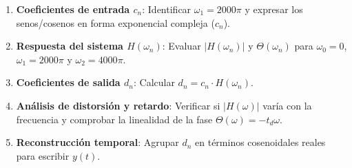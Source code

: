 \begin{mecanizado}
\begin{enumerate}
    \item \textbf{Coeficientes de entrada $c_n$}: Identificar $\omega_1 = 2000\pi$ y expresar los senos/cosenos en forma exponencial compleja ($c_n$).
    \item \textbf{Respuesta del sistema $H(\omega_n)$}: Evaluar $|H(\omega_n)|$ y $\Theta(\omega_n)$ para $\omega_0 = 0$, $\omega_1 = 2000\pi$ y $\omega_2 = 4000\pi$.
    \item \textbf{Coeficientes de salida $d_n$}: Calcular $d_n = c_n \cdot H(\omega_n)$.
    \item \textbf{Análisis de distorsión y retardo}: Verificar si $|H(\omega)|$ varía con la frecuencia y comprobar la linealidad de la fase $\Theta(\omega) = -t_d \omega$.
    \item \textbf{Reconstrucción temporal}: Agrupar $d_n$ en términos cosenoidales reales para escribir $y(t)$.
\end{enumerate}
\end{mecanizado}


